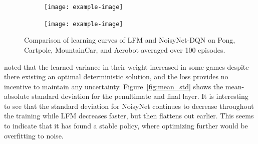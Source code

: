 \documentclass[]{uai2021} %
\begin{document}
\begin{figure}
\begin{subfigure}[b]{0.45\columnwidth}
    \end{subfigure}
    \begin{subfigure}[b]{0.45\columnwidth}
        \centering
        \texttt{[image: example-image]}
    \end{subfigure}
    \begin{subfigure}[b]{0.45\columnwidth}
        \centering
        \texttt{[image: example-image]}
    \end{subfigure}
    \caption{Comparison of learning curves of LFM and NoisyNet-DQN on
    Pong, Cartpole, MountainCar, and Acrobot averaged over 100 episodes.}
    \label{fig:training_curves}
\end{figure}

\cite{fortunato_noisy_2019} noted that the learned variance in their weight increased
in some games despite there existing an optimal deterministic solution, and the loss
provides no incentive to maintain any uncertainty. Figure~\ref{fig:mean_std} shows
the mean-absolute standard deviation for the penultimate and final layer. It is 
interesting to see that the standard deviation for NoisyNet continues to decrease
throughout the training while LFM decreases faster, but then flattens out earlier.
This seems to indicate that it has found a stable policy, where optimizing further would
be overfitting to noise.
\end{document}

